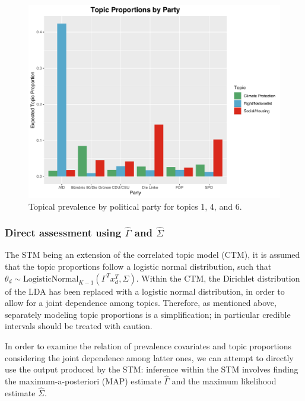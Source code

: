 \begin{figure}[h!]
  \centering
  \captionsetup{justification=centering,margin=2cm}
  \includegraphics[scale = 0.5]{../plots/5_1/quasi_t146_cat.pdf}
  \caption{Topical prevalence by political party for topics 1, 4, and 6.}
  \label{fig:boat1}
\end{figure}

\subsubsection{Direct assessment using $\hat{\Gamma}$ and $\hat{\Sigma}$}

The STM being an extension of the correlated topic model (CTM), it is assumed that the topic proportions follow a logistic normal distribution, such that $\theta_d \sim \text{LogisticNormal}_{K-1}(\Gamma^Tx_d^T, \Sigma)$. Within the CTM, the Dirichlet distribution of the LDA has been replaced with a logistic normal distribution, in order to allow for a joint dependence among topics. Therefore, as mentioned above, separately modeling topic proportions is a simplification; in particular credible intervals should be treated with caution.

In order to examine the relation of prevalence covariates and topic proportions considering the joint dependence among latter ones, we can attempt to directly use the output produced by the STM: inference within the STM involves finding the maximum-a-posteriori (MAP) estimate $\hat{\Gamma}$ and the maximum likelihood estimate $\hat{\Sigma}$. 

